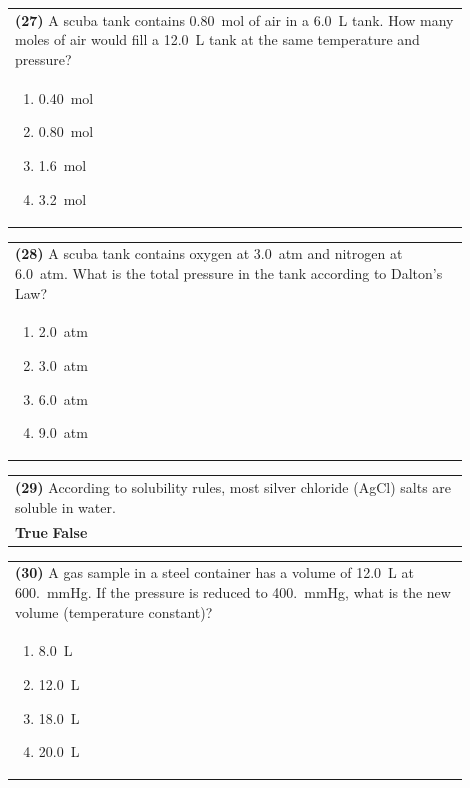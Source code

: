 \documentclass{article}
\begin{document}
{{\noindent\begin{tabular}{|p{0.9\linewidth}|}
\hline
\textbf{(27)} A scuba tank contains 0.80~mol of air in a 6.0~L tank. How many moles of air would fill a 12.0~L tank at the same temperature and pressure?\\[0.2cm]
\begin{minipage}[t]{0.85\linewidth}
\begin{enumerate}[label=\alph*.]
\item 0.40~mol
\item 0.80~mol
\item 1.6~mol
\item 3.2~mol
\end{enumerate}
\end{minipage}\\[0.2cm]
\hline
\end{tabular}

\noindent\begin{tabular}{|p{0.9\linewidth}|}
\hline
\textbf{(28)} A scuba tank contains oxygen at 3.0~atm and nitrogen at 6.0~atm. What is the total pressure in the tank according to Dalton's Law?\\[0.2cm]
\begin{minipage}[t]{0.85\linewidth}
\begin{enumerate}[label=\alph*.]
\item 2.0~atm
\item 3.0~atm
\item 6.0~atm
\item 9.0~atm
\end{enumerate}
\end{minipage}\\[0.2cm]
\hline
\end{tabular}
\newpage

\vspace{0.2cm}
\noindent\begin{tabular}{|p{0.9\linewidth}|}
\hline
\textbf{(29)} According to solubility rules, most silver chloride (AgCl) salts are soluble in water.\\[0.2cm]
\textbf{True} \hspace{1cm} \textbf{False}\\[0.2cm]
\hline
\end{tabular}

\vspace{0.2cm}
\noindent\begin{tabular}{|p{0.9\linewidth}|}
\hline
\textbf{(30)} A gas sample in a steel container has a volume of 12.0~L at 600.~mmHg. If the pressure is reduced to 400.~mmHg, what is the new volume (temperature constant)?\\[0.2cm]
\begin{minipage}[t]{0.85\linewidth}
\begin{enumerate}[label=\alph*.]
\item 8.0~L
\item 12.0~L
\item 18.0~L
\item 20.0~L
\end{enumerate}
\end{minipage}\\[0.2cm]
\hline
\end{tabular}

}}
\end{document}
